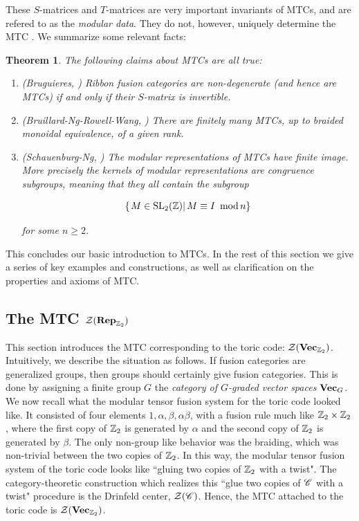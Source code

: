 \documentclass{article}
\newtheorem{theorem}{Theorem}[section]
\theoremstyle{definition}
\numberwithin{figure}{section}
\begin{document}
These $S$-matrices and $T$-matrices are very important invariants of MTCs, and are refered to as the \textit{modular data}. They do not, however, uniquely determine the MTC \cite{mignard2021modular}. We summarize some relevant facts:

\begin{theorem} The following claims about MTCs are all true:

\begin{enumerate}
\item (Bruguieres, \cite{bruguieres2000categories}) Ribbon fusion categories are non-degenerate (and hence are MTCs) if and only if their $S$-matrix is invertible.

\item (Bruillard-Ng-Rowell-Wang, \cite{bruillard2016rank}) There are finitely many MTCs, up to braided monoidal equivalence, of a given rank.

\item (Schauenburg-Ng, \cite{ng2010congruence}) The modular representations of MTCs have finite image. More precisely the kernels of modular representations are \textit{congruence subgroups}, meaning that they all contain the subgroup

$$\left\{ \left. M\in \mathrm{SL}_2(\mathbb{Z}) \right| M\equiv I\,\,\, \mathrm{mod}\, n\right\}$$

for some $n\geq 2$.
\end{enumerate}
\end{theorem}

This concludes our basic introduction to MTCs. In the rest of this section we give a series of key examples and constructions, as well as clarification on the properties and axioms of MTC.

\subsection{The MTC $\mathcal{Z}(\bold{Rep}_{\mathbb{Z}_2})$}
\label{VecZ2 MTC}

This section introduces the MTC corresponding to the toric code: $\mathcal{Z}(\bold{Vec}_{\mathbb{Z}_2})$. Intuitively, we describe the situation as follows. If fusion categories are generalized groups, then groups should certainly give fusion categories. This is done by assigning a finite group $G$ the \textit{category of $G$-graded vector spaces} $\bold{Vec}_G$. We now recall what the modular tensor fusion system for the toric code looked like. It consisted of four elements $1,\alpha,\beta,\alpha\beta$, with a fusion rule much like $\mathbb{Z}_2\times \mathbb{Z}_2$, where the first copy of $\mathbb{Z}_2$ is generated by $\alpha$ and the second copy of $\mathbb{Z}_2$ is generated by $\beta$. The only non-group like behavior was the braiding, which was non-trivial between the two copies of $\mathbb{Z}_2$. In this way, the modular tensor fusion system of the toric code looks like ``gluing two copies of $\mathbb{Z}_2$ with a twist". The category-theoretic construction which realizes this ``glue two copies of $\mathscr{C}$ with a twist" procedure is the Drinfeld center, $\mathcal{Z}(\mathscr{C})$. Hence, the MTC attached to the toric code is $\mathcal{Z}(\bold{Vec}_{\mathbb{Z}_2})$.
\end{document}
